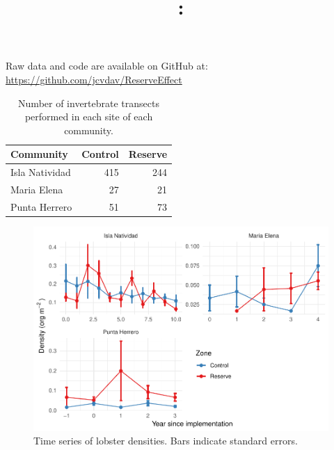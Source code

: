 \documentclass[utf8]{frontiers_suppmat} %
\begin{document}
\onecolumn
{}

\title[Supplementary Material]{{}:
\\ } %


\maketitle


Raw data and code are available on GitHub at:
\url{https://github.com/jcvdav/ReserveEffect}

\begin{table}

\caption{\label{tab:unnamed-chunk-2}Number of invertebrate transects performed in each site of each community.}
\centering
\begin{tabular}[t]{lrr}
\toprule
Community & Control & Reserve\\
\midrule
Isla Natividad & 415 & 244\\
Maria Elena & 27 & 21\\
Punta Herrero & 51 & 73\\
\bottomrule
\end{tabular}
\end{table}

\begin{figure}
\centering
\includegraphics{SupplementaryMaterial_files/figure-latex/unnamed-chunk-3-1.pdf}
\caption{\label{fig:unnamed-chunk-3}Time series of lobster densities. Bars
indicate standard errors.}
\end{figure}
\end{document}
